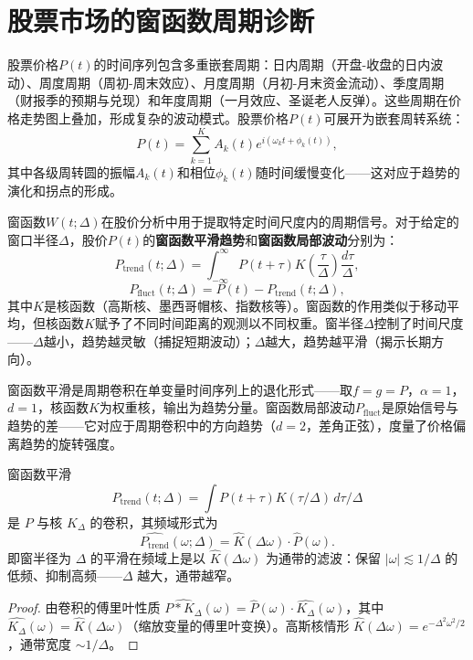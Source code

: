 \section{股票市场的窗函数周期诊断}

\begin{definition}[股票价格的周期结构]\label{def:stock_price_cycle}
股票价格$P(t)$的时间序列包含多重嵌套周期：日内周期（开盘-收盘的日内波动）、周度周期（周初-周末效应）、月度周期（月初-月末资金流动）、季度周期（财报季的预期与兑现）和年度周期（一月效应、圣诞老人反弹）。这些周期在价格走势图上叠加，形成复杂的波动模式。股票价格$P(t)$可展开为嵌套周转系统：
\[
P(t) = \sum_{k=1}^{K} A_k(t) e^{i(\omega_k t + \phi_k(t))},
\]
其中各级周转圆的振幅$A_k(t)$和相位$\phi_k(t)$随时间缓慢变化——这对应于趋势的演化和拐点的形成。
\end{definition}

\begin{definition}[窗函数在股价周期诊断中的应用]\label{def:window_function_stock}
窗函数$W(t; \Delta)$在股价分析中用于提取特定时间尺度内的周期信号。对于给定的窗口半径$\Delta$，股价$P(t)$的\textbf{窗函数平滑趋势}和\textbf{窗函数局部波动}分别为：
\[
P_{\text{trend}}(t; \Delta) = \int_{-\infty}^{\infty} P(t+\tau) K\left(\frac{\tau}{\Delta}\right) \frac{d\tau}{\Delta},
\]
\[
P_{\text{fluct}}(t; \Delta) = P(t) - P_{\text{trend}}(t; \Delta),
\]
其中$K$是核函数（高斯核、墨西哥帽核、指数核等）。窗函数的作用类似于移动平均，但核函数$K$赋予了不同时间距离的观测以不同权重。窗半径$\Delta$控制了时间尺度——$\Delta$越小，趋势越灵敏（捕捉短期波动）；$\Delta$越大，趋势越平滑（揭示长期方向）。

窗函数平滑是周期卷积在单变量时间序列上的退化形式——取$f = g = P$，$\alpha = 1$，$d = 1$，核函数$K$为权重核，输出为趋势分量。窗函数局部波动$P_{\text{fluct}}$是原始信号与趋势的差——它对应于周期卷积中的方向趋势（$d=2$，差角正弦），度量了价格偏离趋势的旋转强度。
\end{definition}

\begin{lemma}[窗函数趋势提取的谱滤波性质]\label{ch29_window_spectral}
窗函数平滑
\[
P_{\text{trend}}(t;\Delta) = \int P(t+\tau) K(\tau/\Delta)\, d\tau/\Delta
\]
是 $P$ 与核 $K_\Delta$ 的卷积，其频域形式为
\[
\widehat{P_{\text{trend}}}(\omega; \Delta) = \hat K(\Delta\omega) \cdot \hat P(\omega).
\]
即窗半径为 $\Delta$ 的平滑在频域上是以 $\hat K(\Delta\omega)$ 为通带的滤波：保留 $|\omega| \lesssim 1/\Delta$ 的低频、抑制高频——$\Delta$ 越大，通带越窄。
\end{lemma}

\begin{proof}
由卷积的傅里叶性质 $\widehat{P * K_\Delta}(\omega) = \hat P(\omega)\cdot \widehat{K_\Delta}(\omega)$，其中 $\widehat{K_\Delta}(\omega) = \hat K(\Delta\omega)$（缩放变量的傅里叶变换）。高斯核情形 $\hat K(\Delta\omega) = e^{-\Delta^2\omega^2/2}$，通带宽度 $\sim 1/\Delta$。
\end{proof}

